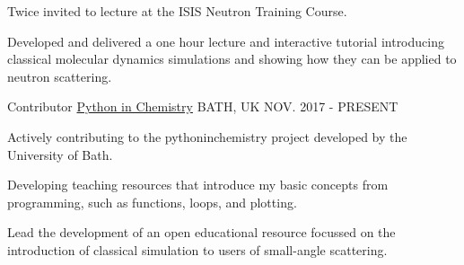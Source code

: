 \begin{cventries}
{\begin{cvitems}
			\item {Twice invited to lecture at the ISIS Neutron Training Course.}
			\item {Developed and delivered a one hour lecture and interactive tutorial introducing classical molecular dynamics simulations and showing how they can be applied to neutron scattering.}
		\end{cvitems}
	}
	\cventry
	{Contributor}
	{\href{http://blogs.bath.ac.uk/python/}{Python in Chemistry}}
	{BATH, UK}
	{NOV. 2017 - PRESENT}
	{
		\begin{cvitems}
			\item {Actively contributing to the pythoninchemistry project developed by the University of Bath.}
			\item {Developing teaching resources that introduce my basic concepts from programming, such as functions, loops, and plotting.}
			\item {Lead the development of an open educational resource focussed on the introduction of classical simulation to users of small-angle scattering.}
		\end{cvitems}
	}
\end{cventries}
